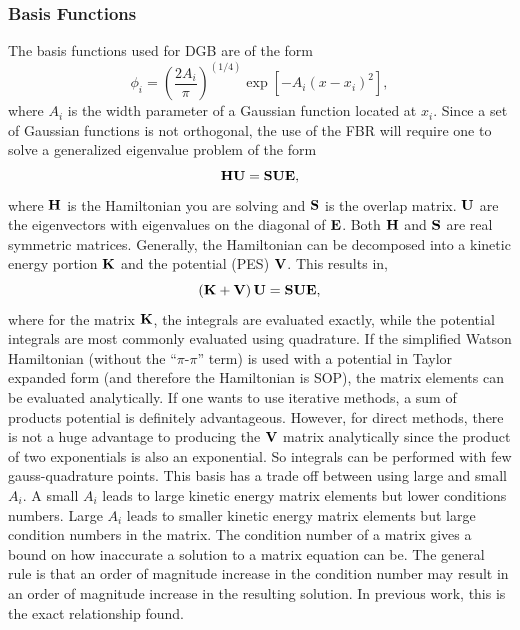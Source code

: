 {\subsubsection{Basis Functions}
The basis functions used for DGB are of the form\cite{Hamilton1986}
\begin{equation}
\label{eq.p1}
\phi_i=\left(\dfrac{2 A_i}{\pi}\right)^{(1/4)}\exp\left[-A_i\left(x-x_i\right)^2\right],
\end{equation}
where $A_i$ is the width parameter of a Gaussian function located at $x_i$. Since a set of Gaussian functions is not orthogonal, the use of the FBR  will require one to solve a generalized eigenvalue problem of the form
\begin{equation}
{{\bf HU}}={{\bf SUE}},
\end{equation}
where ${{\bf H}}$ is the Hamiltonian you are solving and ${{\bf S}}$ is the overlap matrix. ${{\bf U}}$ are the eigenvectors with eigenvalues on the diagonal of ${{\bf E}}$. Both ${{\bf H}}$ and ${{\bf S}}$ are real symmetric matrices. Generally, the Hamiltonian can be decomposed into a kinetic energy portion ${{\bf K}}$ and the potential (PES) ${{\bf V}}$.  This results in,
\begin{equation}
\label{eq.p2}
\left({{\bf K+V}}\right){{\bf U}} = {{\bf SUE}},
\end{equation}
where for the matrix ${{\bf K}}$, the integrals are evaluated exactly, while the potential integrals are most commonly evaluated using quadrature.  If the simplified Watson Hamiltonian\cite{Watson1968} (without the ``$\pi$-$\pi$'' term) is used with a potential in Taylor expanded form (and therefore the Hamiltonian is SOP), the matrix elements can be evaluated analytically. If one wants to use iterative methods, a sum of products potential is definitely advantageous. However, for direct methods, there is not a huge advantage to producing the ${{\bf V}}$ matrix analytically since the product of two exponentials is also an exponential. So integrals can be performed with few gauss-quadrature points.  
This basis has a trade off between using large and small $A_i$.  A small $A_i$ leads to large kinetic energy matrix elements but lower conditions numbers.  Large $A_i$ leads to smaller kinetic energy matrix elements but large condition numbers in the matrix\cite{Garashchuk2001}.  The condition number of a matrix gives a bound on how inaccurate a solution to a matrix equation can be.  The general rule is that an order of magnitude increase in the condition number may result in an order of magnitude increase in the resulting solution. In previous work\cite{vanDijk2011}, this is the exact relationship found.  


}
